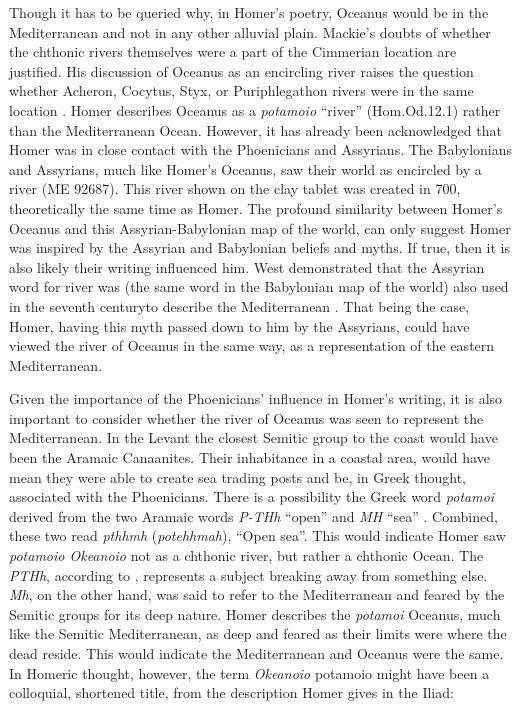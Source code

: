 	Though it has to be queried why, in Homer’s poetry, Oceanus would be in the Mediterranean and not in any other alluvial plain. Mackie’s doubts of whether the chthonic rivers themselves were a part of the Cimmerian location are justified. His discussion of Oceanus as an encircling river raises the question whether Acheron, Cocytus, Styx, or Puriphlegathon rivers were in the same location \parencite[486]{Mackie1999}. Homer describes Oceanus as a \emph{potamoio} “river” (Hom.Od.12.1) rather than the Mediterranean Ocean. However, it has already been acknowledged that Homer was in close contact with the Phoenicians and Assyrians. The Babylonians and Assyrians, much like Homer’s Oceanus, saw their world as encircled by a river (ME 92687). This river shown on the clay tablet was created in 700\BC, theoretically the same time as Homer. The profound similarity between Homer’s Oceanus and this Assyrian-Babylonian map of the world, can only suggest Homer was inspired by the Assyrian and Babylonian beliefs and myths. If true, then it is also likely their writing influenced him. West demonstrated that the Assyrian word for river was (the same word in the Babylonian map of the world) also used in the seventh century\BC to describe the Mediterranean \parencite[145]{West1997}. That being the case, Homer, having this myth passed down to him by the Assyrians, could have viewed the river of Oceanus in the same way, as a representation of the eastern Mediterranean.
		
	Given the importance of the Phoenicians’ influence in Homer’s writing, it is also important to consider whether the river of Oceanus was seen to represent the Mediterranean. In the Levant the closest Semitic group to the coast would have been the Aramaic Canaanites. Their inhabitance in a coastal area, would have mean they were able to create sea trading posts and be, in Greek thought, associated with the Phoenicians. There is a possibility the Greek word \emph{potamoi} derived from the two Aramaic words \emph{P-THh} “open” \parencite[422]{Benner2005} and \emph{MH} “sea” \parencite[166]{Benner2005}. Combined, these two read \emph{pthhmh} (\emph{potehhmah}), “Open sea”. This would indicate Homer saw \emph{potamoio Okeanoio} not as a chthonic river, but rather a chthonic Ocean. The \emph{PTHh}, according to \textcite{Benner2005}, represents a subject breaking away from something else. \emph{Mh}, on the other hand, was said to refer to the Mediterranean and feared by the Semitic groups for its deep nature. Homer describes the \emph{potamoi} Oceanus, much like the Semitic Mediterranean, as deep and feared as their limits were where the dead reside. This would indicate the Mediterranean and Oceanus were the same.  In Homeric thought, however, the term \emph{Okeanoio} potamoio might have been a colloquial, shortened title, from the description Homer gives in the Iliad:
	

